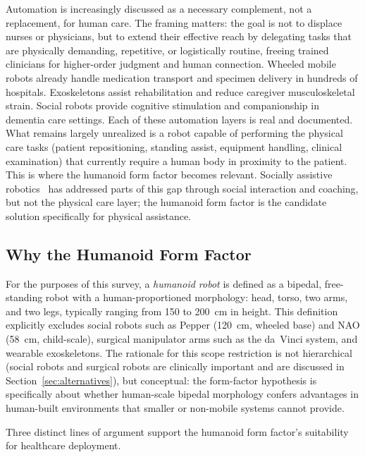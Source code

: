 \documentclass[acmjour]{acmart}
\begin{document}
Automation is increasingly discussed as a necessary complement, not a
replacement, for human care. The framing matters: the goal is not to displace
nurses or physicians, but to extend their effective reach by delegating tasks that
are physically demanding, repetitive, or logistically routine, freeing trained
clinicians for higher-order judgment and human connection. Wheeled mobile robots
already handle medication transport and specimen delivery in hundreds of
hospitals. Exoskeletons assist rehabilitation and reduce caregiver musculoskeletal
strain. Social robots provide cognitive stimulation and companionship in dementia
care settings. Each of these automation layers is real and documented. What
remains largely unrealized is a robot capable of performing the physical care
tasks (patient repositioning, standing assist, equipment handling, clinical
examination) that currently require a human body in proximity to the patient.
This is where the humanoid form factor becomes relevant. Socially assistive
robotics~\cite{feilseifer2005defining,riek2017healthcare} has addressed parts of
this gap through social interaction and coaching, but not the physical care
layer; the humanoid form factor is the candidate solution specifically for
physical assistance.

\subsection{Why the Humanoid Form Factor}
\label{sec:formfactor}

For the purposes of this survey, a \emph{humanoid robot} is defined as a
bipedal, free-standing robot with a human-proportioned morphology: head, torso,
two arms, and two legs, typically ranging from 150 to 200~cm in height. This
definition explicitly excludes social robots such as Pepper (120~cm, wheeled
base) and NAO (58~cm, child-scale), surgical manipulator arms such as the
da~Vinci system, and wearable exoskeletons. The rationale for this scope
restriction is not hierarchical (social robots and surgical robots are
clinically important and are discussed in Section~\ref{sec:alternatives}), but
conceptual: the form-factor hypothesis is specifically about whether human-scale
bipedal morphology confers advantages in human-built environments that smaller or
non-mobile systems cannot provide.

Three distinct lines of argument support the humanoid form factor's suitability
for healthcare deployment.
\end{document}
